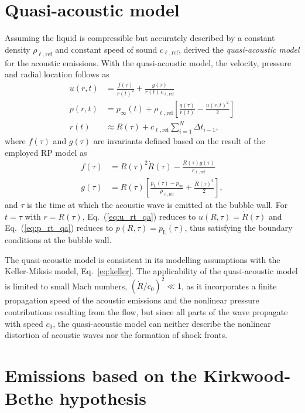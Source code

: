 \section{Quasi-acoustic model}
\label{sec:emissionsqa}

Assuming the liquid is compressible but accurately described by a constant density $\rho_{\ell,\mathrm{ref}}$ and constant speed of sound $c_{\ell,\mathrm{ref}}$, \citet{Gilmore1952} derived the {\it quasi-acoustic model} for the acoustic emissions. With the quasi-acoustic model, the velocity, pressure and radial location follows as
\begin{align}
    u(r,t) &= \frac{f(\tau)}{r(t)^2} + \frac{g(\tau)}{r(t) \, c_{\ell,\mathrm{ref}}}  \label{eq:u_rt_qa} \\
  p(r,t) &=  p_\infty(t) + \rho_{\ell,\mathrm{ref}} \left[ \frac{g(\tau)}{r(t)} - \frac{u(r,t)^2}{2} \right] \label{eq:p_rt_qa} \\
  r(t) &\approx R(\tau) + c_{\ell,\mathrm{ref}} \sum_{i=1}^N \Delta t_{i-1}, \label{eq:r_t_qa}
\end{align}
where $f(\tau)$ and $g(\tau)$ are invariants defined based on the result of the employed RP model as
\begin{align}
    f(\tau) &= R(\tau)^2 \dot{R}(\tau) - \frac{R(\tau) g(\tau)}{c_{\ell,\mathrm{ref}}}\\
    g(\tau) &= R(\tau) \left[\frac{p_\mathrm{L}(\tau)-p_\infty}{\rho_{\ell,\mathrm{ref}}} + \frac{\dot{R}(\tau)^2}{2} \right],
\end{align}
and $\tau$ is the time at which the acoustic wave is emitted at the bubble wall. For $t=\tau$ with $r=R(\tau)$, Eq.~(\ref{eq:u_rt_qa}) reduces to $u(R,\tau)=\dot{R}(\tau)$ and Eq.~(\ref{eq:p_rt_qa}) reduces to $p(R,\tau)=p_\mathrm{L}(\tau)$, thus satisfying the boundary conditions at the bubble wall. 

The quasi-acoustic model is consistent in its modelling assumptions with the Keller-Miksis model, Eq.~\eqref{eq:keller}. The applicability of the quasi-acoustic model is limited to small Mach numbers, $(\dot{R}/c_0)^2 \ll 1$, as it incorporates a finite propagation speed of the acoustic emissions and the nonlinear pressure contributions resulting from the flow, but since all parts of the wave propagate with speed $c_0$, the quasi-acoustic model can neither describe the nonlinear distortion of acoustic waves nor the formation of shock fronts. 

\section{Emissions based on the Kirkwood-Bethe hypothesis}
\label{sec:emissionskb}

